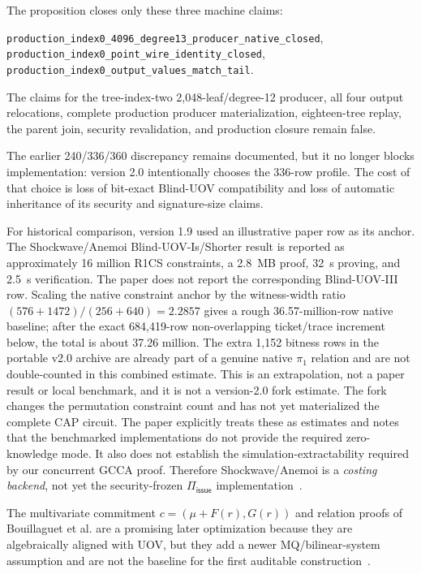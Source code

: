 \documentclass[11pt]{article}
\newcommand{\Piiss}{\Pi_{\mathsf{issue}}}
\begin{document}
The proposition closes only these three machine claims:
\begin{center}\small
\texttt{production\_index0\_4096\_degree13\_producer\_native\_closed},\\
\texttt{production\_index0\_point\_wire\_identity\_closed},\\
\texttt{production\_index0\_output\_values\_match\_tail}.
\end{center}
The claims for the
tree-index-two 2,048-leaf/degree-12 producer, all four output relocations,
complete production producer materialization, eighteen-tree replay, the parent
join, security revalidation, and production closure remain false.

The earlier 240/336/360 discrepancy remains documented, but it no longer
blocks implementation: version 2.0 intentionally chooses the 336-row profile.
The cost of that choice is loss of bit-exact Blind-UOV compatibility and loss
of automatic inheritance of its security and signature-size claims.

For historical comparison, version 1.9 used an illustrative paper row as its
anchor.  The Shockwave/Anemoi Blind-UOV-Is/Shorter result is reported as
approximately 16 million R1CS
constraints, a 2.8~MB proof, 32~s proving, and 2.5~s verification.  The paper
does not report the corresponding Blind-UOV-III row.  Scaling the native
constraint anchor by the witness-width ratio
$(576+1472)/(256+640)=2.2857$ gives a rough 36.57-million-row native baseline;
after the exact 684,419-row non-overlapping ticket/trace increment below, the
total is about 37.26 million.  The extra 1,152 bitness rows in the portable
v2.0 archive are already part of a genuine native $\pi_1$ relation and are not
double-counted in this combined estimate.
This is an extrapolation, not a paper result or local benchmark, and it is not
a version-2.0 fork estimate.  The fork changes the permutation constraint count
and has not yet materialized the complete CAP circuit.  The paper
explicitly treats these as estimates and notes that the benchmarked
implementations do not provide the required zero-knowledge mode.  It also does
not establish the simulation-extractability required by our concurrent GCCA
proof.  Therefore Shockwave/Anemoi is a \emph{costing backend}, not yet the
security-frozen $\Piiss$ implementation~\cite{blind-uov}.

The multivariate commitment
$c=(\mu+F(r),G(r))$ and relation proofs of Bouillaguet et al.
are a promising later optimization because they are algebraically aligned with
UOV, but they add a newer MQ/bilinear-system assumption and are not the baseline
for the first auditable construction~\cite{mq-commitments}.
\end{document}
